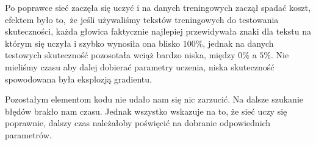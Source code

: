 Po poprawce sieć zaczęła się uczyć i na danych treningowych zaczął spadać koszt, efektem było to, że 
jeśli używaliśmy tekstów treningowych do testowania skuteczności, każda głowica faktycznie najlepiej przewidywała
znaki dla tekstu na którym się uczyła i szybko wynosiła ona blisko $100\%$, jednak na danych testowych 
skuteczność pozosotała wciąż bardzo niska, między $0\%$ a $5\%$. Nie mieliśmy czasu aby dalej dobierać parametry uczenia,
niska skuteczność spowodowana była eksplozją gradientu. 

Pozostałym elementom kodu nie udało nam się nic zarzucić. Na dalsze szukanie błędów brakło nam czasu. 
Jednak wszystko wskazuje na to, że sieć uczy się poprawnie, dalszy czas należałoby poświęcić na dobranie odpowiednich
parametrów.
